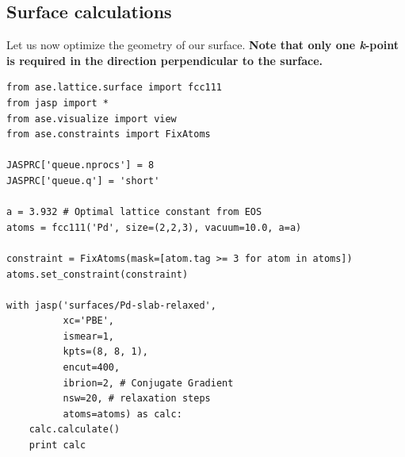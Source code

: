 \documentclass[11pt]{article}
\begin{document}
\subsection{Surface calculations}
\label{sec-3-2}

Let us now optimize the geometry of our surface. \textbf{Note that only one \emph{k}-point is required in the direction perpendicular to the surface.}

\begin{verbatim}
from ase.lattice.surface import fcc111
from jasp import *
from ase.visualize import view
from ase.constraints import FixAtoms

JASPRC['queue.nprocs'] = 8
JASPRC['queue.q'] = 'short'

a = 3.932 # Optimal lattice constant from EOS
atoms = fcc111('Pd', size=(2,2,3), vacuum=10.0, a=a)

constraint = FixAtoms(mask=[atom.tag >= 3 for atom in atoms])
atoms.set_constraint(constraint)

with jasp('surfaces/Pd-slab-relaxed',
          xc='PBE',
          ismear=1,
          kpts=(8, 8, 1),
          encut=400,
          ibrion=2, # Conjugate Gradient
          nsw=20, # relaxation steps
          atoms=atoms) as calc:
    calc.calculate()
    print calc
\end{verbatim}
\end{document}
